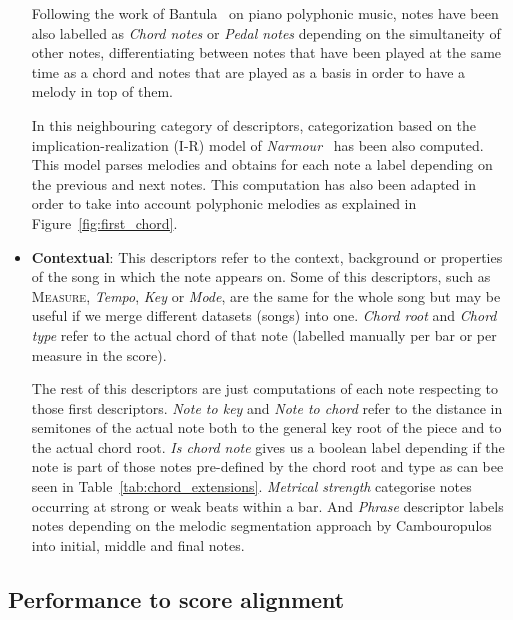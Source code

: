 \begin{itemize}
Following the work of Bantula~\cite{bantula2016} on piano polyphonic music, notes have been also labelled as \textit{Chord notes} or \textit{Pedal notes} depending on the simultaneity of other notes, differentiating between notes that have been played at the same time as a chord and notes that are played as a basis in order to have a melody in top of them.

In this neighbouring category of descriptors, categorization based on the implication-realization (I-R) model of \textit{Narmour}~\cite{narmour1992analysis} has been also computed.  This model parses melodies and obtains for each note a label depending on the previous and next notes. This computation has also been adapted in order to take into account polyphonic melodies as explained in Figure~\ref{fig:first_chord}. 

\item \textbf{Contextual}: This descriptors refer to the context, background or properties of the song in which the note appears on. Some of this descriptors, such as \textsc{Measure}, \textit{Tempo}, \textit{Key} or \textit{Mode}, are the same for the whole song but may be useful if we merge different datasets (songs) into one. \textit{Chord root} and \textit{Chord type} refer to the actual chord of that note (labelled manually per bar or per measure in the score).

The rest of this descriptors are just computations of each note respecting to those first descriptors. \textit{Note to key} and \textit{Note to chord} refer to the distance in semitones of the actual note both to the general key root of the piece and to the actual chord root. \textit{Is chord note} gives us a boolean label depending if the note is part of those notes pre-defined by the chord root and type as can bee seen in Table~\ref{tab:chord_extensions}. \textit{Metrical strength} categorise notes occurring at strong or weak beats within a bar. And \textit{Phrase} descriptor labels notes depending on the melodic segmentation approach by Cambouropulos~\cite{Cambouropoulos1997a} into initial, middle and final notes.

\end{itemize}



\subsection{Performance to score alignment}
\label{sec:p2salignment}

